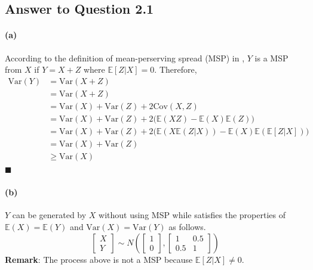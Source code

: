 \documentclass[11pt]{article}
\theoremstyle{definition}
\theoremstyle{boldtitle} %
\numberwithin{equation}{section}
\numberwithin{figure}{section}
\numberwithin{table}{section}
\begin{document}
\subsection{Answer to Question 2.1}
\paragraph{(a)}
According to the definition of mean-perserving spread (MSP) in \cite{Rothschild:1978},
$Y$ is a MSP from $X$ if $Y = X + Z$ where $\mathbb{E}[Z|X] = 0$.
Therefore, 
\begin{align*}
  \text{Var}(Y) & = \text{Var}(X + Z) \\ 
  & = \text{Var}(X + Z) \\
  & = \text{Var}(X) + \text{Var}(Z) + 2 \text{Cov}(X, Z) \\
  & = \text{Var}(X) + \text{Var}(Z) + 2 \bigg(\mathbb{E}(XZ) - \mathbb{E}(X) \mathbb{E}(Z)\bigg) \\
  & = \text{Var}(X) + \text{Var}(Z) + 2 \bigg(\mathbb{E}(X\mathbb{E}(Z|X)) - \mathbb{E}(X) \mathbb{E}(\mathbb{E}[Z|X])\bigg) \\
  & = \text{Var}(X) + \text{Var}(Z) \\
  & \geq \text{Var}(X)
\end{align*}
\(\blacksquare\)

\paragraph{(b)}
$Y$ can be generated by $X$ without using MSP while satisfies the properties of $\mathbb{E}(X) =\mathbb{E}(Y)$ and 
$\text{Var}(X) = \text{Var}(Y)$ as follows.
\begin{equation}
  \begin{bmatrix}
    X \\ Y
  \end{bmatrix}
  \sim N\left(
  \begin{bmatrix}
    1 \\ 0
  \end{bmatrix},
  \begin{bmatrix}
    1 & 0.5 \\ 
    0.5 & 1
  \end{bmatrix}
  \right)
\end{equation}
\textbf{Remark}: The process above is not a MSP because $\mathbb{E}[Z|X] \neq 0$.
\end{document}
